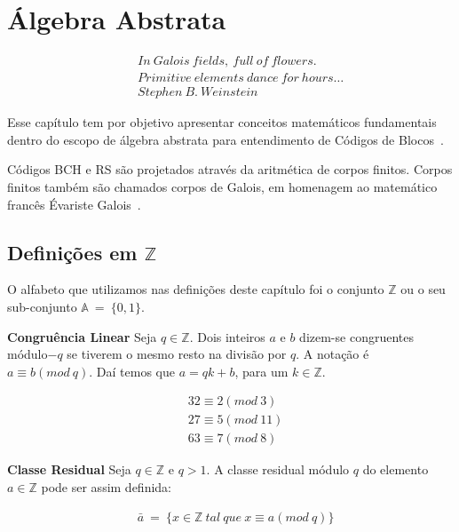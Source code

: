 \chapter{Álgebra Abstrata}



{\small
\begin{align*}
&& In\ Galois\ fields,\ full\ of\ flowers.\\
&& Primitive\ elements\ dance\ for\ hours \ldots\\
&& Stephen\ B.\ Weinstein
\end{align*}
}


Esse capítulo tem por objetivo apresentar conceitos matemáticos fundamentais
dentro do escopo de álgebra abstrata para entendimento de Códigos de Blocos~\cite{Hefez:2008}.

Códigos BCH e RS são projetados através da aritmética de corpos finitos. Corpos finitos
também são chamados corpos de Galois, em homenagem ao matemático francês Évariste Galois~\cite{Connell:2004}.

\section{Definições em $\mathbb{Z}$}

O alfabeto que utilizamos nas definições deste capítulo foi o conjunto $\mathbb{Z}$ ou o seu sub-conjunto $\mathbb{A}\ =\ \{ 0, 1\}$.

\begin{definition} {\bf Congruência Linear}  Seja $q \in \mathbb{Z}$. Dois inteiros $a$
 e $b$ dizem-se congruentes módulo$-q$ se tiverem o mesmo resto na divisão por
 $q$. A notação é $a \equiv b(mod\ q)$. Daí temos que $a = qk + b$, para um $k \in \mathbb{Z}$.
\end{definition}

\begin{example}
\begin{align*}
& 32 \equiv 2(mod\ 3)\\
& 27 \equiv 5(mod\ 11)\\
& 63 \equiv 7(mod\ 8)
\end{align*}
\end{example}


\begin{definition} {\bf Classe Residual}  Seja $q \in \mathbb{Z}$ e $q > 1$. A classe
residual módulo $q$ do elemento $a \in \mathbb{Z}$ pode ser assim definida:

\begin{align*}
& \bar{a}\ =\ \{ x \in \mathbb{Z}\ tal\ que\ x \equiv a(mod\ q)\}
\end{align*}

\end{definition}

